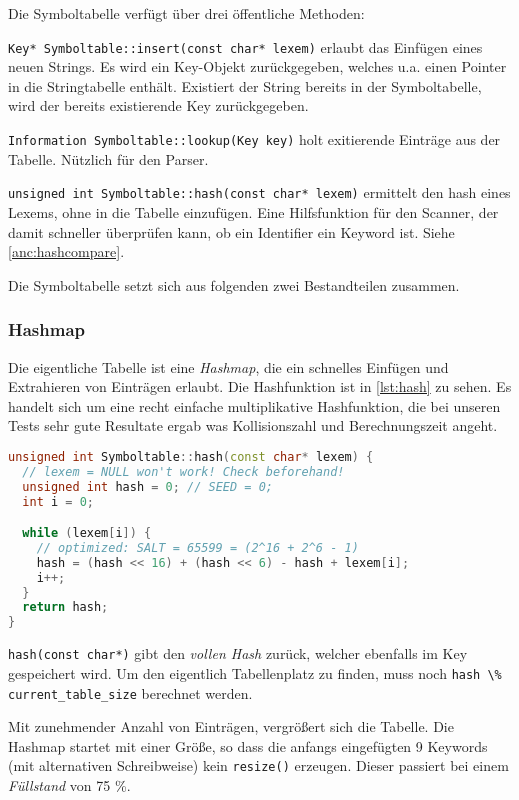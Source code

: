 \documentclass[
a4paper,   %
11pt,      %
oneside,   %
onecolumn, %
final      %
]{article}
\newcommand{\code}[1]{\lstinline$#1$}
\begin{document}
Die Symboltabelle verfügt über drei öffentliche Methoden:
\begin{description}
\item \code{Key* Symboltable::insert(const char* lexem)} erlaubt das Einfügen eines neuen Strings.
Es wird ein Key-Objekt zurückgegeben, welches u.a. einen Pointer in die Stringtabelle enthält.
Existiert der String bereits in der Symboltabelle, wird der bereits existierende Key zurückgegeben.
\item \code{Information Symboltable::lookup(Key key)} holt exitierende Einträge aus der Tabelle.
Nützlich für den Parser.
\item \code{unsigned int Symboltable::hash(const char* lexem)} ermittelt den hash eines Lexems, ohne in die Tabelle einzufügen.
Eine Hilfsfunktion für den Scanner, der damit schneller überprüfen kann, ob ein Identifier ein Keyword ist. Siehe \ref{anc:hashcompare}.
\end{description}

Die Symboltabelle setzt sich aus folgenden zwei Bestandteilen zusammen.

\subsubsection{Hashmap}
Die eigentliche Tabelle ist eine \emph{Hashmap}, die ein schnelles Einfügen und Extrahieren von Einträgen erlaubt.
Die Hashfunktion ist in \ref{lst:hash} zu sehen.
Es handelt sich um eine recht einfache multiplikative Hashfunktion, die bei unseren Tests sehr gute Resultate ergab was Kollisionszahl und Berechnungszeit angeht.

\begin{lstlisting}[language=C++, firstnumber=172, caption={Die Hashfunktion.}, label=lst:hash]
unsigned int Symboltable::hash(const char* lexem) {
  // lexem = NULL won't work! Check beforehand!
  unsigned int hash = 0; // SEED = 0;
  int i = 0;

  while (lexem[i]) {
    // optimized: SALT = 65599 = (2^16 + 2^6 - 1)
    hash = (hash << 16) + (hash << 6) - hash + lexem[i];
    i++;
  }
  return hash;
}
\end{lstlisting}

\code{hash(const char*)} gibt den \emph{vollen Hash} zurück, welcher ebenfalls im Key gespeichert wird.
Um den eigentlich Tabellenplatz zu finden, muss noch \code{hash \% current_table_size} berechnet werden.

Mit zunehmender Anzahl von Einträgen, vergrößert sich die Tabelle.
Die Hashmap startet mit einer Größe, so dass die anfangs eingefügten 9 Keywords (mit alternativen Schreibweise) kein \code{resize()} erzeugen.
Dieser passiert bei einem \emph{Füllstand} von 75 \%.
\end{document}
